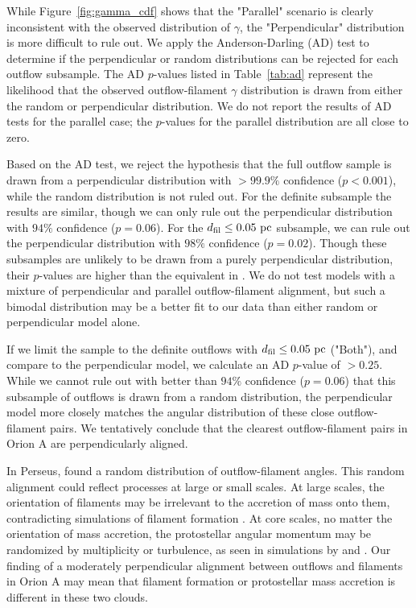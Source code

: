 \documentclass[twocolumn]{aastex63}
\begin{document}
While Figure~\ref{fig:gamma_cdf} shows that the "Parallel" scenario is clearly inconsistent with the observed distribution of $\gamma$, the "Perpendicular" distribution is more difficult to rule out. We apply the Anderson-Darling (AD) test \citep{Stephens74} to determine if the perpendicular or random distributions can be rejected for each outflow subsample. The AD $p$-values listed in Table~\ref{tab:ad} represent the likelihood that the observed outflow-filament $\gamma$ distribution is drawn from either the random or perpendicular distribution. We do not report the results of AD tests for the parallel case; the $p$-values for the parallel distribution are all close to zero.

Based on the AD test, we reject the hypothesis that the full outflow sample is drawn from a perpendicular distribution with $>99.9\%$ confidence ($p < 0.001$), while the random distribution is not ruled out. For the definite subsample the results are similar, though we can only rule out the perpendicular distribution with $94\%$ confidence ($p = 0.06$). For the $d_{\rm fil} \leq 0.05~\rm{pc}$ subsample, we can rule out the perpendicular distribution with $98\%$ confidence ($p = 0.02$). Though these subsamples are unlikely to be drawn from a purely perpendicular distribution, their $p$-values are higher than the equivalent in \citet{Stephens17}. We do not test models with a mixture of perpendicular and parallel outflow-filament alignment, but such a bimodal distribution may be a better fit to our data than either random or perpendicular model alone.

If we limit the sample to the definite outflows with $d_{\rm fil} \leq 0.05~\rm{pc}$ ("Both"), and compare to the perpendicular model, we calculate an AD $p$-value of $> 0.25$. While we cannot rule out with better than $94\%$ confidence ($p = 0.06$) that this subsample of outflows is drawn from a random distribution, the perpendicular model more closely matches the angular distribution of these close outflow-filament pairs. We tentatively conclude that the clearest outflow-filament pairs in Orion A are perpendicularly aligned.

In Perseus, \citet{Stephens17} found a random distribution of outflow-filament angles. This random alignment could reflect processes at large or small scales. At large scales, the orientation of filaments may be irrelevant to the accretion of mass onto them, contradicting simulations of filament formation \citep[e.g.][]{Chen14,Clarke17}. At core scales, no matter the orientation of mass accretion, the protostellar angular momentum may be randomized by multiplicity or turbulence, as seen in simulations by \citet{Offner16} and \citet{Lee17}. Our finding of a moderately perpendicular alignment between outflows and filaments in Orion A may mean that filament formation or protostellar mass accretion is different in these two clouds.
\end{document}
